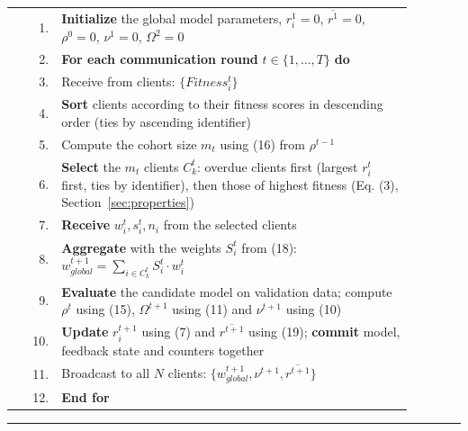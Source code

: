 \documentclass[pdflatex,sn-mathphys-num,oneside]{sn-jnl}%
\theoremstyle{thmstyleone}%
\theoremstyle{thmstyletwo}%
\theoremstyle{thmstylethree}%
\begin{document}
\noindent\begin{tabular}{r@{\hspace{0.7em}}p{0.88\linewidth}}
1.  & \textbf{Initialize} the global model parameters, $r^1_i = 0$, $\overline{r^1}=0$, $\rho^0=0$, $\nu^1=0$, $\Omega^2=0$\\
2.  & \textbf{For each communication round} $t \in \{1,\ldots,T\}$ \textbf{do}\\
3.  & \hspace{2em}Receive from clients: $\{Fitness^t_i\}$\\
4.  & \hspace{1em}\textbf{Sort} clients according to their fitness scores in descending order (ties by ascending identifier)\\
5.  & \hspace{2em}Compute the cohort size $m_t$ using (16) from $\rho^{t-1}$\\
6.  & \hspace{1em}\textbf{Select} the $m_t$ clients $C^t_k$: overdue clients first (largest $r^t_i$ first, ties by identifier), then those of highest fitness (Eq. (3), Section~\ref{sec:properties})\\
7.  & \hspace{1em}\textbf{Receive} $w^t_i, s^t_i, n_i$ from the selected clients\\
8.  & \hspace{1em}\textbf{Aggregate} with the weights $S^t_i$ from (18):
$w^{t+1}_{global}=\displaystyle\sum_{i \in C^t_k} S^t_i \cdot w^t_i$\\
9.  & \hspace{1em}\textbf{Evaluate} the candidate model on validation data; compute $\rho^t$ using (15), $\Omega^{t+1}$ using (11) and $\nu^{t+1}$ using (10)\\
10. & \hspace{1em}\textbf{Update} $r^{t+1}_i$ using (7) and $\overline{r^{t+1}}$ using (19); \textbf{commit} model, feedback state and counters together\\
11. & \hspace{2em}Broadcast to all $N$ clients: $\{w^{t+1}_{global}, \nu^{t+1}, \overline{r^{t+1}}\}$\\
12. & \textbf{End for}\\
\end{tabular}

\vspace{1mm}
\noindent\rule{\linewidth}{0.4pt}
\endgroup
\end{document}
